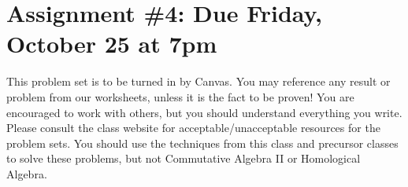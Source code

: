 \documentclass[12pt]{amsart}
\newcommand{\showsol}[1]{\def\displaysol{#1}}
\begin{document}
\showsol{1}
	
	\thispagestyle{empty}
	
	\section*{Assignment \#4: Due Friday, October 25 at 7pm}
	
	This problem set is to be turned in by Canvas. You may reference any result or problem from our worksheets, unless it is the fact to be proven! You are encouraged to work with others, but you should understand everything you write. Please consult the class website for acceptable/unacceptable resources for the problem sets. You should use the techniques from this class and precursor classes to solve these problems, but not Commutative Algebra II or Homological Algebra.
	
	
	\
	
\end{document}

